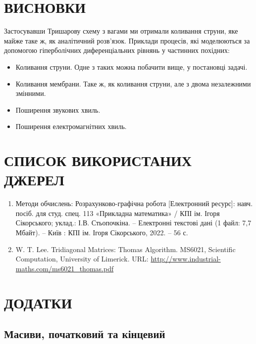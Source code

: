 \documentclass{article}
\begin{document}
    \section{ВИСНОВКИ}
        Застосувавши Тришарову схему з вагами ми отримали коливання струни, яке майже таке ж, як аналітичний розв'язок.
        Приклади процесів, які моделюються за допомогою гіперболічних диференціальних рівнянь у частинних похідних:
        \begin{itemize}
            \item Коливання струни. Одне з таких можна побачити вище, у постановці задачі.
            \item Коливання мембрани. Таке ж, як коливання струни, але з двома незалежними змінними.
            \item Поширення звукових хвиль.
            \item Поширення електромагнітних хвиль.
        \end{itemize}
    \newpage
    \section{СПИСОК ВИКОРИСТАНИХ ДЖЕРЕЛ}
    \begin{enumerate}
        \item Методи обчислень: Розрахунково-графічна робота [Електронний ресурс]:
            навч. посіб. для студ. спец. 113 «Прикладна математика» / КПІ ім. Ігоря
            Сікорського; уклад.: І.В. Стьопочкіна. – Електронні текстові дані (1 файл: 7,7
            Мбайт). – Київ : КПІ ім. Ігоря Сікорського, 2022. – 56 с.
        \item W. T. Lee.
            Tridiagonal Matrices: Thomas Algorithm. 
            MS6021, Scientific Computation, University of Limerick.
            URL: \url{http://www.industrial-maths.com/ms6021_thomas.pdf}
    \end{enumerate}
    \newpage
    \section{ДОДАТКИ}
        \subsection{Масиви, початковий та кінцевий}
            \label{subsec:xsr}
\end{document}
